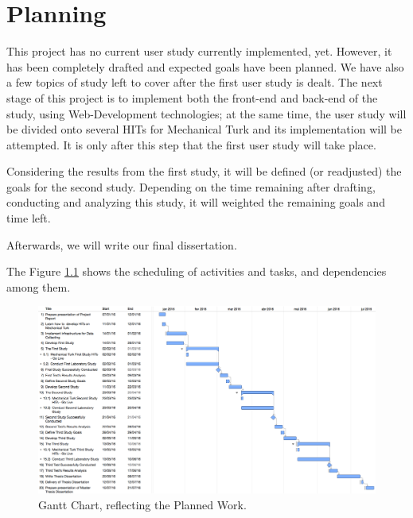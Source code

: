 \documentclass{report}
\begin{document}
\chapter{Planning}
This project has no current user study currently implemented, yet. However, it has been completely drafted and expected goals have been planned.
We have also a few topics of study left to cover after the first user study is dealt. The next stage of this project is to implement both the front-end
and back-end of the study, using Web-Development technologies; at the same time, the user study will be divided onto several HITs for Mechanical Turk
and its implementation will be attempted. It is only after this step that the first user study will take place. \par
Considering the results from the first study, it will be defined (or readjusted) the goals for the second study. Depending on the time remaining after
drafting, conducting and analyzing this study, it will weighted the remaining goals and time left. \par
Afterwards, we will write our final dissertation. \par
The Figure \ref{fig:augmented} shows the scheduling of activities and tasks, and dependencies among them.
%
\begin{figure}[h!]
	\centering
    \includegraphics[width=1\textwidth]{Gantt.png}
    \caption[Gantt Chart of Planning]{Gantt Chart, reflecting the Planned Work.}
    \label{fig:augmented}
\end{figure} 
%
\end{document}
